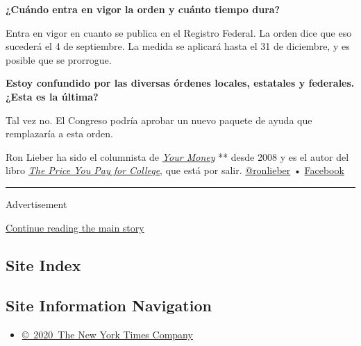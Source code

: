 \textbf{¿Cuándo entra en vigor la orden y cuánto tiempo dura?}

Entra en vigor en cuanto se publica en el Registro Federal. La orden
dice que eso sucederá el 4 de septiembre. La medida se aplicará hasta el
31 de diciembre, y es posible que se prorrogue.

\textbf{Estoy confundido por las diversas órdenes locales, estatales y
federales. ¿Esta es la última?}

Tal vez no. El Congreso podría aprobar un nuevo paquete de ayuda que
remplazaría a esta orden.

Ron Lieber ha sido el columnista de
\href{https://www.nytimes3xbfgragh.onion/column/your-money}{\emph{Your
Money}} ** desde 2008 y es el autor del libro
\href{http://ronlieber.com/books/what-to-pay-for-college/}{\emph{The
Price You Pay for College}}, que está por salir.
\href{https://twitter.com/ronlieber}{@ronlieber} •
\href{https://www.facebookcorewwwi.onion/facebookcorewwwi.onion/ronlieberauthor}{Facebook}

\begin{center}\rule{0.5\linewidth}{\linethickness}\end{center}

Advertisement

\protect\hyperlink{after-bottom}{Continue reading the main story}

\hypertarget{site-index}{%
\subsection{Site Index}\label{site-index}}

\hypertarget{site-information-navigation}{%
\subsection{Site Information
Navigation}\label{site-information-navigation}}

\begin{itemize}
\tightlist
\item
  \href{https://help.nytimes3xbfgragh.onion/hc/en-us/articles/115014792127-Copyright-notice}{©~2020~The
  New York Times Company}
\end{itemize}

